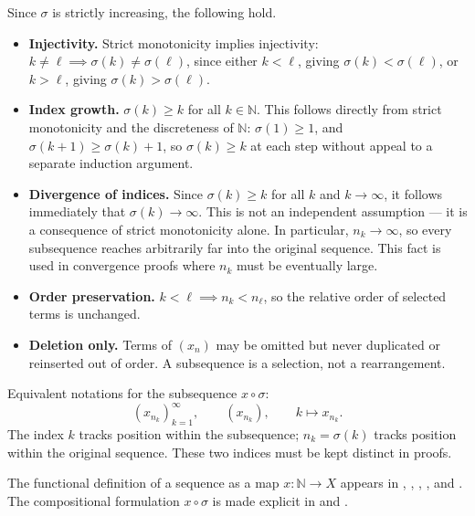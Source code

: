 \begin{remark}
Since $\sigma$ is strictly increasing, the following hold.
\begin{itemize}
  \item \textbf{Injectivity.} Strict monotonicity implies injectivity:
        $k \neq \ell \implies \sigma(k) \neq \sigma(\ell)$,
        since either $k < \ell$, giving $\sigma(k) < \sigma(\ell)$,
        or $k > \ell$, giving $\sigma(k) > \sigma(\ell)$.

  \item \textbf{Index growth.} $\sigma(k) \geq k$ for all $k \in \mathbb{N}$.
        This follows directly from strict monotonicity and the discreteness
        of $\mathbb{N}$: $\sigma(1) \geq 1$, and $\sigma(k+1) \geq \sigma(k) + 1$,
        so $\sigma(k) \geq k$ at each step without appeal to a separate
        induction argument.

  \item \textbf{Divergence of indices.} Since $\sigma(k) \geq k$ for all $k$
        and $k \to \infty$, it follows immediately that $\sigma(k) \to \infty$.
        This is not an independent assumption — it is a consequence of strict
        monotonicity alone. In particular, $n_k \to \infty$, so every
        subsequence reaches arbitrarily far into the original sequence.
        This fact is used in convergence proofs where $n_k$ must be
        eventually large.

  \item \textbf{Order preservation.} $k < \ell \implies n_k < n_\ell$,
        so the relative order of selected terms is unchanged.

  \item \textbf{Deletion only.} Terms of $(x_n)$ may be omitted but
        never duplicated or reinserted out of order. A subsequence is
        a selection, not a rearrangement.
\end{itemize}
\end{remark}

\begin{remark}
Equivalent notations for the subsequence $x \circ \sigma$:
\[
(x_{n_k})_{k=1}^{\infty},
\qquad
(x_{n_k}),
\qquad
k \mapsto x_{n_k}.
\]
The index $k$ tracks position within the subsequence;
$n_k = \sigma(k)$ tracks position within the original sequence.
These two indices must be kept distinct in proofs.
\end{remark}

\begin{remark}[Sources]
The functional definition of a sequence as a map $x : \mathbb{N} \to X$
appears in ,
,
,
,
and .
The compositional formulation $x \circ \sigma$ is made explicit in
and .
\end{remark}
\FloatBarrier

